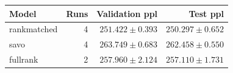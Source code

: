 \begin{tabular}{lrrr}
\toprule
Model & Runs & Validation ppl & Test ppl \\
\midrule
rankmatched & 4 & $251.422 \pm 0.393$ & $250.297 \pm 0.652$ \\
savo & 4 & $263.749 \pm 0.683$ & $262.458 \pm 0.550$ \\
fullrank & 2 & $257.960 \pm 2.124$ & $257.110 \pm 1.731$ \\
\bottomrule
\end{tabular}
